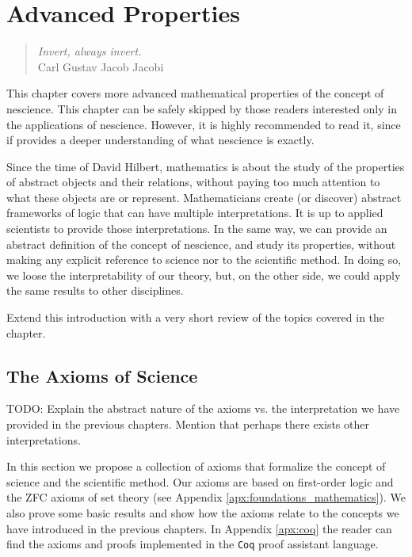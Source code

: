 %
%


\chapter{Advanced Properties}
\label{chap:Properties-Nescience}

\begin{quote}
\begin{flushright}
\emph{Invert, always invert.}\\
Carl Gustav Jacob Jacobi\\
\end{flushright}
\end{quote}
\bigskip

This chapter covers more advanced mathematical properties of the concept of nescience. This chapter can be safely skipped by those readers interested only in the applications of nescience. However, it is highly recommended to read it, since if provides a deeper understanding of what nescience is exactly.

Since the time of David Hilbert, mathematics is about the study of the properties of abstract objects and their relations, without paying too much attention to what these objects are or represent. Mathematicians create (or discover) abstract frameworks of logic that can have multiple interpretations. It is up to applied scientists to provide those interpretations. In the same way, we can provide an abstract definition of the concept of nescience, and study its properties, without making any explicit reference to science nor to the scientific method. In doing so, we loose the interpretability of our theory, but, on the other side, we could apply the same results to other disciplines.

{\color{red} Extend this introduction with a very short review of the topics covered in the chapter.}

%
%

\section{The Axioms of Science}

{\color{red} TODO: Explain the abstract nature of the axioms vs. the interpretation we have provided in the previous chapters. Mention that perhaps there exists other interpretations.}

In this section we propose a collection of axioms that formalize the concept of science and the scientific method. Our axioms are based on first-order logic and the ZFC axioms of set theory (see Appendix \ref{apx:foundations_mathematics}). We also prove some basic results and show how the axioms relate to the concepts we have introduced in the previous chapters. In Appendix \ref{apx:coq} the reader can find the axioms and proofs implemented in the \texttt{Coq} proof assistant language.

